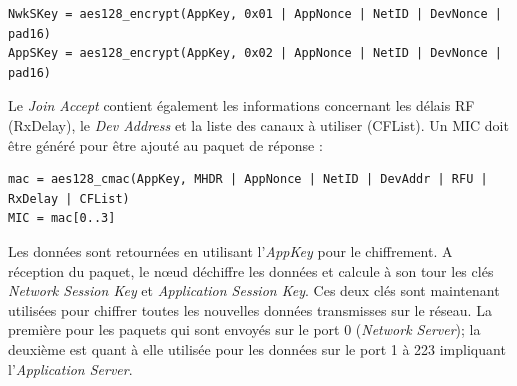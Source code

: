 \begin{tcolorbox}[top=-3mm, bottom=-3mm, left=0mm, right=0mm, enhanced, breakable, colback=LightGray, colframe=DarkGray, colbacktitle=DarkGray]
\begin{verbatim}
NwkSKey = aes128_encrypt(AppKey, 0x01 | AppNonce | NetID | DevNonce | pad16)
AppSKey = aes128_encrypt(AppKey, 0x02 | AppNonce | NetID | DevNonce | pad16)
\end{verbatim}
\end{tcolorbox}

Le \textit{Join Accept} contient également les informations concernant les délais RF (RxDelay), le \textit{Dev Address} et la liste des canaux à utiliser (CFList). Un MIC doit être généré pour être ajouté au paquet de réponse :

\begin{tcolorbox}[top=-3mm, bottom=-3mm, left=0mm, right=0mm, enhanced, breakable, colback=LightGray, colframe=DarkGray, colbacktitle=DarkGray]
\begin{verbatim}
mac = aes128_cmac(AppKey, MHDR | AppNonce | NetID | DevAddr | RFU | RxDelay | CFList)
MIC = mac[0..3]
\end{verbatim}
\end{tcolorbox}

Les données sont retournées en utilisant l'\textit{AppKey} pour le chiffrement. A réception du paquet, le n\oe ud déchiffre les données et calcule à son tour les clés \textit{Network Session Key} et \textit{Application Session Key}. Ces deux clés sont maintenant utilisées pour chiffrer toutes les nouvelles données transmisses sur le réseau. La première pour les paquets qui sont envoyés sur le port 0 (\textit{Network Server}); la deuxième est quant à elle utilisée pour les données sur le port 1 à 223 impliquant l'\textit{Application Server}.



